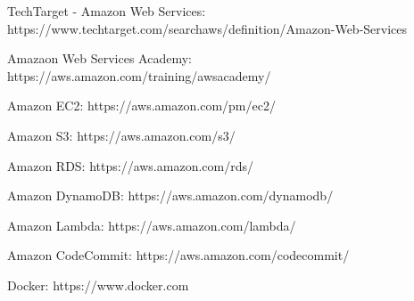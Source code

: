 \documentclass[11pt,a4paper,oneside]{report}
\begin{document}
\begin{thebibliography}{9}
  TechTarget - Amazon Web Services: https://www.techtarget.com/searchaws/definition/Amazon-Web-Services

  Amazaon Web Services Academy: https://aws.amazon.com/training/awsacademy/

  Amazon EC2: https://aws.amazon.com/pm/ec2/

  Amazon S3: https://aws.amazon.com/s3/

  Amazon RDS: https://aws.amazon.com/rds/

  Amazon DynamoDB: https://aws.amazon.com/dynamodb/

  Amazon Lambda: https://aws.amazon.com/lambda/

  Amazon CodeCommit: https://aws.amazon.com/codecommit/

  Docker: https://www.docker.com


\end{thebibliography}
\end{document}
